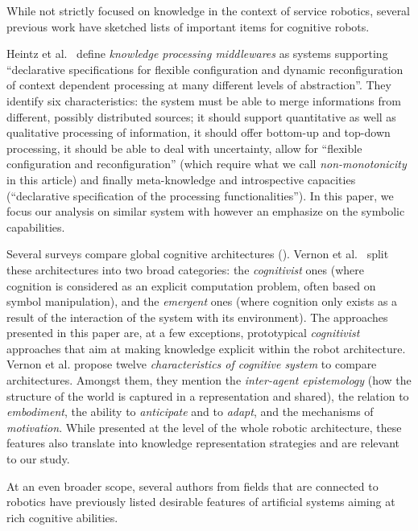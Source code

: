 While not strictly focused on knowledge in the context of
service robotics, several previous work have sketched lists of important items for cognitive robots.

Heintz et al.~\cite{Heintz2008} define
\emph{knowledge processing middlewares} as systems supporting ``declarative
specifications for flexible configuration and dynamic reconfiguration of
context dependent processing at many different levels of abstraction''. They
identify six characteristics: the system must be able to merge informations
from different, possibly distributed sources; it should support quantitative as
well as qualitative processing of information, it should offer bottom-up and
top-down processing, it should be able to deal with uncertainty, allow for
``flexible configuration and reconfiguration'' (which require what we call
\emph{non-monotonicity} in this article) and finally meta-knowledge and
introspective capacities (``declarative specification of the processing
functionalities''). In this paper, we focus our analysis on similar system with
however an emphasize on the symbolic capabilities.

Several surveys compare global cognitive architectures (\cite{Vernon2007, Chong2009}).
Vernon et al.~\cite{Vernon2007} split these architectures into two broad
categories: the \emph{cognitivist} ones (where cognition is considered as an
explicit computation problem, often based on symbol manipulation), and the
\emph{emergent} ones (where cognition only exists as a result of the
interaction of the system with its environment). The approaches presented in
this paper are, at a few exceptions, prototypical \emph{cognitivist} approaches
that aim at making knowledge explicit within the robot architecture. Vernon et
al. propose twelve \emph{characteristics of cognitive system} to compare
architectures. Amongst them, they mention the \emph{inter-agent epistemology} (how
the structure of the world is captured in a representation and shared), the
relation to \emph{embodiment}, the ability to \emph{anticipate} and to
\emph{adapt}, and the mechanisms of \emph{motivation}. While presented at the
level of the whole robotic architecture, these features also translate into
knowledge representation strategies and are relevant to our study.

At an even broader scope, several authors from fields that are connected to robotics
have previously listed desirable features of artificial systems aiming at
rich cognitive abilities.

